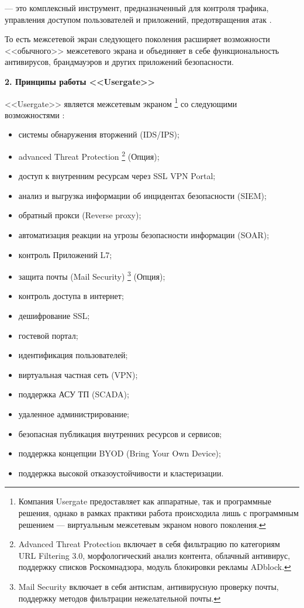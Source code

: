  --- это комплексный инструмент, предназначенный для контроля трафика, управления доступом пользователей и приложений, предотвращения атак \cite{ngfw2}.

То есть межсетевой экран следующего поколения расширяет возможности <<обычного>> межсетевого экрана и объединяет в себе функциональность антивирусов, брандмауэров и других приложений безопасности.

\begin{center}
	\textbf{\Large 2. Принципы работы <<Usergate>>}
\end{center}

<<Usergate>> является межсетевым экраном \footnote{Компания Usergate предоставляет как аппаратные, так и программные решения, однако в рамках практики работа происходила лишь с программным решением --- виртуальным межсетевым экраном нового поколения.} со следующими \\ возможностями \cite{usergate_capabilities}:
		
\begin{itemize}
	\item системы обнаружения вторжений (IDS/IPS);
	\item advanced Threat Protection \footnote{Advanced Threat Protection включает в себя фильтрацию по категориям URL Filtering 3.0, морфологический анализ контента, облачный антивирус, поддержку списков Роскомнадзора, модуль блокировки рекламы ADblock.} (Опция);
	\item доступ к внутренним ресурсам через SSL VPN Portal;
	\item анализ и выгрузка информации об инцидентах безопасности (SIEM);
	\item обратный прокси (Reverse proxy);
	\item автоматизация реакции на угрозы безопасности информации (SOAR);
	\item контроль Приложений L7;
	\item защита почты (Mail Security) \footnote{Mail Security включает в себя антиспам, антивирусную проверку почты, поддержку методов фильтрации нежелательной почты.} (Опция);
	\item контроль доступа в интернет;
	\item дешифрование SSL;
	\item гостевой портал;
	\item идентификация пользователей;
	\item виртуальная частная сеть (VPN);
	\item поддержка АСУ ТП (SCADA);
	\item удаленное администрирование;
	\item безопасная публикация внутренних ресурсов и сервисов;
	\item поддержка концепции BYOD (Bring Your Own Device);
	\item поддержка высокой отказоустойчивости и кластеризации.
\end{itemize}
	
